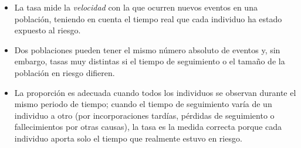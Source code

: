 \documentclass[
  spanish,
  a4paper,
]{scrreport}
\providecommand{\tightlist}{%
  \setlength{\itemsep}{0pt}\setlength{\parskip}{0pt}}
\theoremstyle{definition}
\theoremstyle{definition}
\theoremstyle{remark}
\begin{document}
\begin{tcolorbox}[enhanced jigsaw, arc=.35mm, bottomrule=.15mm, bottomtitle=1mm, breakable, colback=white, colbacktitle=quarto-callout-note-color!10!white, colframe=quarto-callout-note-color-frame, coltitle=black, left=2mm, leftrule=.75mm, opacityback=0, opacitybacktitle=0.6, rightrule=.15mm, title=\textcolor{quarto-callout-note-color}{\faInfo}\hspace{0.5em}{Interpretación}, titlerule=0mm, toprule=.15mm, toptitle=1mm]

\begin{itemize}
\tightlist
\item
  La tasa mide la \emph{velocidad} con la que ocurren nuevos eventos en
  una población, teniendo en cuenta el tiempo real que cada individuo ha
  estado expuesto al riesgo.
\item
  Dos poblaciones pueden tener el mismo número absoluto de eventos y,
  sin embargo, tasas muy distintas si el tiempo de seguimiento o el
  tamaño de la población en riesgo difieren.
\item
  La proporción es adecuada cuando todos los individuos se observan
  durante el mismo periodo de tiempo; cuando el tiempo de seguimiento
  varía de un individuo a otro (por incorporaciones tardías, pérdidas de
  seguimiento o fallecimientos por otras causas), la tasa es la medida
  correcta porque cada individuo aporta solo el tiempo que realmente
  estuvo en riesgo.
\end{itemize}

\end{tcolorbox}
\end{document}
